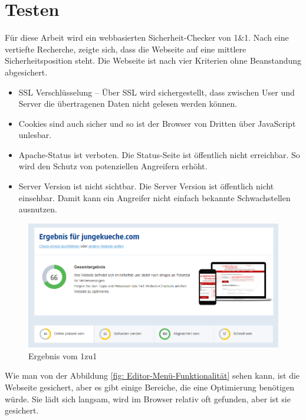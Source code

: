 \pagebreak

\section{Testen} 


Für diese Arbeit wird ein webbasierten Sicherheit-Checker von 1\&1. Nach eine vertiefte Recherche, zeigte sich, dass die Webseite auf eine mittlere Sicherheitsposition steht. Die Webseite ist nach vier Kriterien ohne Beanstandung abgesichert.

\begin{itemize}	
	
\item\ac{SSL} Verschlüsselung – Über SSL wird sichergestellt, dass zwischen User und Server die übertragenen Daten nicht gelesen werden können.

\item Cookies sind auch sicher und so ist der Browser von Dritten über JavaScript unlesbar.

\item Apache-Status ist verboten. Die Status-Seite ist öffentlich nicht erreichbar. So wird den Schutz von potenziellen Angreifern erhöht. 

\item Server Version ist nicht sichtbar. Die Server Version ist öffentlich nicht einsehbar. Damit kann ein Angreifer nicht einfach bekannte Schwachstellen ausnutzen.
\end{itemize}

\begin{figure}[h]
	\centering
	\includegraphics[width=1\linewidth]{Graphics/egebnis1to1.png}
	\caption[Egebniss Von 1zu1]{Ergebnis vom 1zu1}
	\label{fig: Egebniss Von 1zu1}
\end{figure}

Wie man von der Abbildung \ref{fig: Editor-Menü-Funktionalität} sehen kann, ist die Webseite gesichert, aber es gibt einige Bereiche, die eine Optimierung benötigen würde. Sie lädt sich langsam, wird im Browser relativ oft gefunden, aber ist sie gesichert. 


